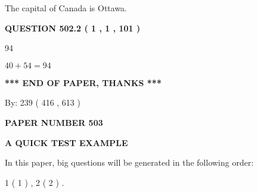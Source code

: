 \documentclass[12pt]{article}
\begin{document}
 
The capital of Canada is Ottawa.
 
 
 
 
  
\vspace{0.2in}
  
{\textbf{\Large{QUESTION
502.2 
 ( 1 , 1 , 101 )
}}}
  
  
 
 
\noindent{}

94
 
 
 
 
\noindent{}

$ %
40 +  %
54=   %
94$
 
 
   
   
 \vspace{0.2in}
 
   
   
   
   
\vspace{1.0in} 
{\textbf{\large{ *** END OF PAPER, THANKS *** }}} 
   
   
\hspace{1.0in} By: 
 239 ( 416 ,  613 )
   
   
   
   
\newpage 
\setcounter{page}{ 
   503001 } 
   
   
   
   
 {\textbf{ \Large{ PAPER NUMBER  503  }}}
   
   
\vspace{0.2in}
   
   
   
   
   
   
 \vspace{0.2in}
{\LARGE {\textbf{ A QUICK TEST EXAMPLE}}}
   
   
   
\vspace{0.2in}
   
In this paper, big questions will be generated in the following order: 
   
   
   1 ( 1 )
 ,
   2 ( 2 )
 .
  
\vspace{0.2in}
  
\end{document}
